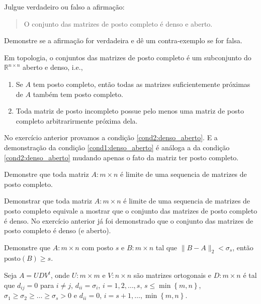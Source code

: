 \begin{questions}
     Julgue verdadeiro ou falso a afirma\c{c}\~{a}o:
    \begin{quote}
        O conjunto das matrizes de posto completo \'{e} denso e aberto.
    \end{quote}
    Demonstre se a afirma\c{c}\~{a}o for verdadeira e d\^{e} um contra-exemplo se for falsa.
    \begin{solution}
        Em topologia, o conjuntos das matrizes de posto completo \'{e} um subconjunto do $\mathbb{R}^{n \times n}$ aberto e denso, i.e.,
        \begin{enumerate}
            \item Se $A$ tem posto completo, ent\~{a}o todas as matrizes suficientemente pr\'{o}ximas de $A$ tamb\'{e}m tem posto completo. \label{cond1:denso_aberto}
            \item Toda matriz de posto incompleto possue pelo menos uma matriz de posto completo arbitrarirmente pr\'{o}xima dela. \label{cond2:denso_aberto}
        \end{enumerate}
        No exerc\'{i}cio anterior provamos a condi\c{c}\~{a}o \ref{cond2:denso_aberto}. E a demonstra\c{c}\~{a}o da condi\c{c}\~{a}o \ref{cond1:denso_aberto} \'{e} an\'{a}loga a da condi\c{c}\~{a}o \ref{cond2:denso_aberto} mudando apenas o fato da matriz ter posto completo.
    \end{solution}

    \question Demonstre que toda matriz $A : m \times n$ \'{e} limite de uma sequencia de matrizes de posto completo.
    \begin{solution}
        Demonstrar que toda matriz $A : m \times n$ \'{e} limite de uma sequencia de matrizes de posto completo equivale a mostrar que o conjunto das matrizes de posto completo \'{e} denso. No exerc\'{i}cio anterior j\'{a} foi demonstrado que o conjunto das matrizes de posto completo \'{e} denso (e aberto).
    \end{solution}

    \question Demonstre que $A : m \times n$ com posto $s$ e $B : m \times n$ tal que $\| B - A \|_2 < \sigma_s$, ent\~{a}o $\mathrm{posto}(B) \geq s$.
    \begin{solution}
        Seja $A = U D V^t$, onde $U : m \times m$ e $V : n \times n$ s\~{a}o matrizes ortogonais e $D : m \times n$ \'{e} tal que $d_{ij} = 0$ para $i \neq j$, $d_{ii} = \sigma_i$, $i = 1, 2, \ldots, s$, $s \leq \min\left\{ m, n \right\}$, $\sigma_1 \geq \sigma_2 \geq \ldots \geq \sigma_s > 0$ e $d_{ii} = 0$, $i = s + 1, \ldots, \min\left\{ m, n \right\}$. 


\end{solution}
\end{questions}
